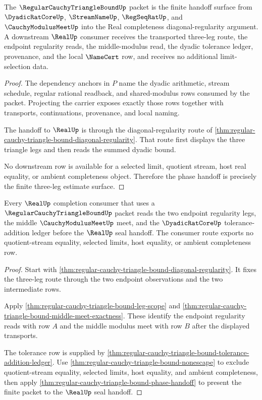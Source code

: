 \begin{theorem}
\label{thm:regular-cauchy-triangle-bound-phase-handoff}
The $\RegularCauchyTriangleBoundUp$ packet is the finite handoff surface from $\DyadicRatCoreUp$, $\StreamNameUp$, $\RegSeqRatUp$, and $\CauchyModulusMeetUp$ into the Real completeness diagonal-regularity argument. A downstream $\RealUp$ consumer receives the transported three-leg route, the endpoint regularity reads, the middle-modulus read, the dyadic tolerance ledger, provenance, and the local $\NameCert$ row, and receives no additional limit-selection data.
\end{theorem}
\begin{proof}
The dependency anchors in $P$ name the dyadic arithmetic, stream schedule, regular rational readback, and shared-modulus rows consumed by the packet. Projecting the carrier exposes exactly those rows together with transports, continuations, provenance, and local naming.

The handoff to $\RealUp$ is through the diagonal-regularity route of \autoref{thm:regular-cauchy-triangle-bound-diagonal-regularity}. That route first displays the three triangle legs and then reads the summed dyadic bound.

No downstream row is available for a selected limit, quotient stream, host real equality, or ambient completeness object. Therefore the phase handoff is precisely the finite three-leg estimate surface.
\end{proof}

\begin{theorem}
\label{thm:regular-cauchy-triangle-real-consumer-route}
Every $\RealUp$ completion consumer that uses a
$\RegularCauchyTriangleBoundUp$ packet reads the two endpoint regularity legs,
the middle $\CauchyModulusMeetUp$ meet, and the $\DyadicRatCoreUp$
tolerance-addition ledger before the $\RealUp$ seal handoff. The consumer
route exports no quotient-stream equality, selected limits, host equality, or
ambient completeness row.
\end{theorem}
\begin{proof}
Start with
\autoref{thm:regular-cauchy-triangle-bound-diagonal-regularity}. It fixes the
three-leg route through the two endpoint observations and the two intermediate
rows.

Apply \autoref{thm:regular-cauchy-triangle-bound-leg-scope} and
\autoref{thm:regular-cauchy-triangle-bound-middle-meet-exactness}. These
identify the endpoint regularity reads with row $A$ and the middle modulus meet
with row $B$ after the displayed transports.

The tolerance row is supplied by
\autoref{thm:regular-cauchy-triangle-bound-tolerance-addition-ledger}. Use
\autoref{thm:regular-cauchy-triangle-bound-nonescape} to exclude
quotient-stream equality, selected limits, host equality, and ambient
completeness, then apply
\autoref{thm:regular-cauchy-triangle-bound-phase-handoff} to present the finite
packet to the $\RealUp$ seal handoff.
\end{proof}

